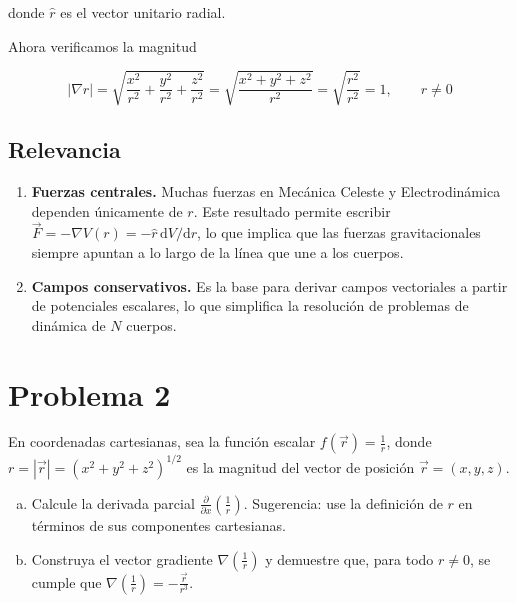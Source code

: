 \documentclass[12pt, letterpaper]{article}
\begin{document}
donde $\hat{r}$ es el vector unitario radial.

Ahora verificamos la magnitud

$$
|\nabla r|
    = \sqrt{\frac{x^2}{r^2}+\frac{y^2}{r^2}+\frac{z^2}{r^2}}
    = \sqrt{\frac{x^2+y^2+z^2}{r^2}}
    = \sqrt{\frac{r^2}{r^2}}
    = 1, \qquad r \neq 0
$$

\subsection{Relevancia}

\begin{enumerate}
    \item \textbf{Fuerzas centrales.} Muchas fuerzas en Mecánica Celeste y Electrodinámica
          dependen únicamente de $r$. Este resultado permite escribir
          $\vec{F} = -\nabla V(r) = -\hat{r}\,\mathrm{d}V/\mathrm{d}r$, lo que implica que
          las fuerzas gravitacionales siempre apuntan a lo largo de la línea que une a los
          cuerpos.
          
    \item \textbf{Campos conservativos.} Es la base para derivar campos vectoriales a partir
          de potenciales escalares, lo que simplifica la resolución de problemas de dinámica
          de $N$ cuerpos.
\end{enumerate}


\section{Problema 2}

En coordenadas cartesianas, sea la función escalar $f(\vec{r}) = \frac{1}{r}$, donde $r = |\vec{r}| = (x^2 + y^2 + z^2)^{1/2}$ es la magnitud del vector de posición $\vec{r} = (x, y, z)$.

\begin{enumerate}[a)]
    \item Calcule la derivada parcial $\frac{\partial}{\partial x} \left( \frac{1}{r} \right)$. Sugerencia: use la definición de $r$ en términos de sus componentes cartesianas.
    \item Construya el vector gradiente $\nabla \left( \frac{1}{r} \right)$ y demuestre que, para todo $r \neq 0$, se cumple que $\nabla \left( \frac{1}{r} \right) = -\frac{\vec{r}}{r^3}$.
\end{enumerate}
\end{document}
